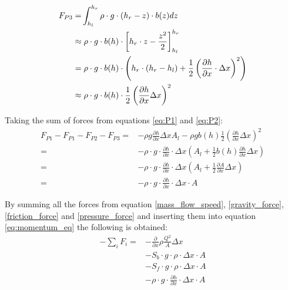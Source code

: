 \begin{equation}
\begin{aligned}
	F_{P3}=& \int_{h_l}^{h_r} \rho \cdot g \cdot (h_r - z)\cdot b(z)dz \vspace{2mm} \\
		  \approx& \hspace{1mm} \rho \cdot g \cdot b(h) \cdot \left[ h_r \cdot z - \frac{z^2}{2}  \right]_{h_l}^{h_r} \\
		  =& \hspace{1mm} \rho \cdot g \cdot b(h) \cdot \left( h_r\cdot (h_r -h_l) + \frac{1}{2} \left( \frac{\partial h}{\partial x} \cdot \Delta x\right)^2 \right) \\
	\approx& \hspace{1mm} \rho \cdot g \cdot b(h) \cdot \frac{1}{2}\left(\frac{\partial h}{\partial x}\Delta x\right)^2
\end{aligned}	
\end{equation}	

Taking the sum of forces from equations \ref{eq:P1} and \ref{eq:P2}:
\begin{equation}
\begin{aligned}
F_{P1} -F_{P1} -F_{P2} - F_{P3} =& 
	 -\rho g \frac{\partial h}{\partial x}\Delta x A_l 
	 -\rho g b(h) \frac{1}{2}\left(\frac{\partial h}{\partial x}\Delta x\right)^2 \\
=& -\rho\cdot g \cdot \frac{\partial h}{\partial x} \cdot \Delta x \left(A_l + \frac{1}{2}b(h)\frac{\partial h}{\partial x} \Delta x \right) \\
=& -\rho\cdot g \cdot \frac{\partial h}{\partial x} \cdot \Delta x \left(A_l + \frac{1}{2}\frac{\partial A}{\partial x} \Delta x \right) \\
=&-\rho\cdot g \cdot \frac{\partial h}{\partial x} \cdot \Delta x  \cdot A  
\label{pressure_force}
\end{aligned}
\end{equation}

By summing all the forces from equation \ref{mass_flow_speed}, \ref{gravity_force}, \ref{friction_force} and \ref{pressure_force} and inserting them into equation \ref{eq:momentum_eq} the following is obtained:
\begin{equation}
\begin{aligned}
-\sum_{i} F_i	=&- \frac{\partial}{\partial x} \rho \frac{Q^2}{A}\Delta x \\
&-S_b \cdot g \cdot \rho \cdot \Delta x \cdot A \\
&-S_f \cdot g \cdot \rho \cdot \Delta x \cdot A \\ 
&-\rho\cdot g \cdot \frac{\partial h}{\partial x} \cdot \Delta x \cdot A
\end{aligned}
\label{eq:sum_of_forces}
\end{equation}


